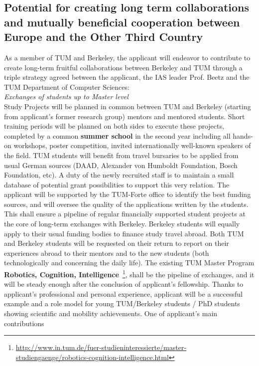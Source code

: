 \subsection{Potential for creating long term collaborations and mutually beneficial cooperation between 
Europe and the Other Third Country} 
As a member of TUM and Berkeley, the applicant  will endeavor to contribute to create long-term
fruitful  collaborations  between  Berkeley and TUM through  a triple strategy 
agreed between the applicant, the IAS  leader Prof.  Beetz and the  TUM Department  
of  Computer Sciences:\\
\emph{Exchanges  of students  up  to  Master level}\\  
Study  Projects will  be planned in common between TUM and  Berkeley
(starting  from  applicant's  former   research  group)  mentors  and  mentored
students.  Short training  periods will  be planned  on both  sides to
execute these  projects, completed  by a common  \textbf{summer school}  in the
second  year  including all  hands-on  workshops, poster  competition,
invited  internationally  well-known   speakers  of  the  field.   TUM
students will benefit  from travel bursaries to be  applied from usual
German  sources  (DAAD,   Alexander  von  Humboldt  Foundation,  Bosch
Foundation, etc). A duty of  the newly recruited staff is to maintain
a small database of potential grant possibilities to support this very
relation. The applicant will be supported  by the TUM-Forte office to identify the
best  funding  sources,  and    will  oversee  the  quality  of  the
applications written by the students.  This shall ensure a pipeline of
regular  financially  supported  student   projects  at  the  core  of
long-term  exchanges  with   Berkeley. Berkeley  students will equally  apply to
their usual funding bodies to finance study travel abroad.  Both TUM and
Berkeley students  will be  requested on
their return  to report on  their experiences abroad to  their mentors
and to the new students (both technologically and concerning the daily
life).   The  existing  TUM  Master  Program  \textbf{Robotics,  Cognition,
Intelligence}~\footnote{\url{http://www.in.tum.de/fuer-studieninteressierte/master-studiengaenge/robotics-cognition-intelligence.html}}, 
shall  be the  pipeline of exchanges,  and it  will be
steady  enough after  the conclusion  of applicant's  fellowship.  Thanks  to applicant's
professional and  personal experience, applicant will be  a successful example
and  a role  model for  young TUM/Berkeley  students /  PhD  students showing
scientific  and mobility  achievements. One  of applicant's  main contributions
